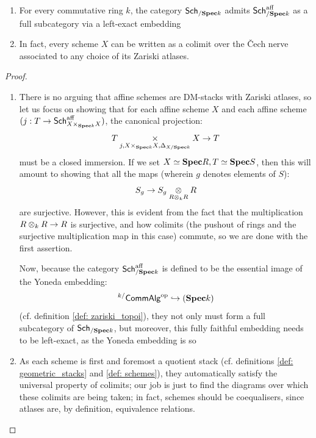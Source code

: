                 \begin{proposition} \label{prop: affine_schemes_are_schemes}
                    \noindent
                    \begin{enumerate}
                        \item For every commutative ring $k$, the category $\mathsf{Sch}_{/\mathbf{Spec} k}$ admits $\mathsf{Sch}^{\mathrm{aff}}_{/\mathbf{Spec} k}$ as a full subcategory via a left-exact embedding
                        \item In fact, every scheme $X$ can be written as a colimit over the \v{C}ech nerve associated to any choice of its Zariski atlases.
                    \end{enumerate}
                \end{proposition}
                    \begin{proof}
                        \noindent
                        \begin{enumerate}
                            \item There is no arguing that affine schemes are DM-stacks with Zariski atlases, so let us focus on showing that for each affine scheme $X$ and each affine scheme $(j: T \to \Sch^{\aff}_{X \x_{\Spec k} X})$, the canonical projection:
                                $$T \x_{j, X \x_{\Spec k} X, \Delta_{X/\Spec k}} X \to T$$
                            must be a closed immersion. If we set $X \simeq \mathbf{Spec} R, T \simeq \mathbf{Spec} S$, then this will amount to showing that all the maps (wherein $g$ denotes elements of $S$):
                                $$S_g \to S_g \tensor_{R \tensor_k R} R$$
                            are surjective. However, this is evident from the fact that the multiplication $R \tensor_k R \to R$ is surjective, and how colimits (the pushout of rings and the surjective multiplication map in this case) commute, so we are done with the first assertion. 
                            
                            Now, because the category $\mathsf{Sch}^{\mathrm{aff}}_{/\mathbf{Spec} k}$ is defined to be the essential image of the Yoneda embedding:
                                $${}^{k/}\mathsf{Comm}\mathsf{Alg}^{\mathrm{op}} \hookrightarrow (\mathbf{Spec} k)$$
                            (cf. definition \ref{def: zariski_topoi}), they not only must form a full subcategory of $\mathsf{Sch}_{/\mathbf{Spec} k}$, but moreover, this fully faithful embedding needs to be left-exact, as the Yoneda embedding is so
                            \item As each scheme is first and foremost a quotient stack (cf. definitions \ref{def: geometric_stacks} and \ref{def: schemes}), they automatically satisfy the universal property of colimits; our job is just to find the diagrams over which these colimits are being taken; in fact, schemes should be coequalisers, since atlases are, by definition, equivalence relations.  
                        \end{enumerate}
                    \end{proof}
